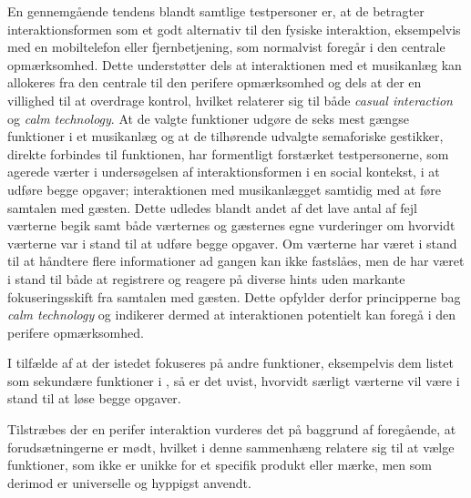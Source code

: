 En gennemgående tendens blandt samtlige testpersoner er, at de betragter interaktionsformen som et godt alternativ til den fysiske interaktion, eksempelvis med en mobiltelefon eller fjernbetjening, som normalvist foregår i den centrale opmærksomhed. Dette understøtter dels at interaktionen med et musikanlæg kan allokeres fra den centrale til den perifere opmærksomhed og dels at der en villighed til at overdrage kontrol, hvilket relaterer sig til både \textit{casual interaction} og \textit{calm technology}. \blankline
%
At de valgte funktioner udgøre de seks mest gængse funktioner i et musikanlæg og at de tilhørende udvalgte semaforiske gestikker, direkte forbindes til funktionen, har formentligt forstærket testpersonerne, som agerede værter i undersøgelsen af interaktionsformen i en social kontekst, i at udføre begge opgaver; interaktionen med musikanlægget samtidig med at føre samtalen med gæsten. Dette udledes blandt andet af det lave antal af fejl værterne begik samt både værternes og gæsternes egne vurderinger om hvorvidt værterne var i stand til at udføre begge opgaver. Om værterne har været i stand til at håndtere flere informationer ad gangen kan ikke fastslåes, men de har været i stand til både at registrere og reagere på diverse hints uden markante fokuseringsskift fra samtalen med gæsten. Dette opfylder derfor principperne bag \textit{calm technology} og indikerer dermed at interaktionen potentielt kan foregå i den perifere opmærksomhed.

I tilfælde af at der istedet fokuseres på andre funktioner, eksempelvis dem listet som sekundære funktioner i , så er det uvist, hvorvidt særligt værterne vil være i stand til at løse begge opgaver. 

Tilstræbes der en perifer interaktion vurderes det på baggrund af foregående, at forudsætningerne er mødt, hvilket i denne sammenhæng relatere sig til at vælge funktioner, som ikke er unikke for et specifik produkt eller mærke, men som derimod er universelle og hyppigst anvendt. 
%
